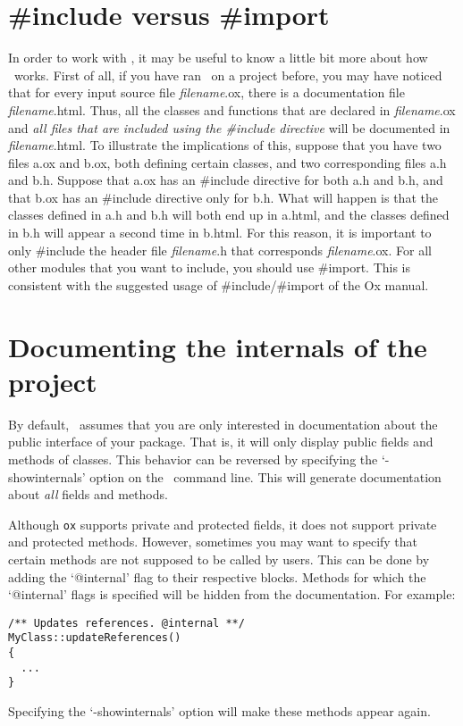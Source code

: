 \section{\#include versus \#import}
In order to work with \oxdoc, it may be useful to know a little bit more about how
\oxdoc~works. First of all, if you have ran \oxdoc~on a project before, you may have
noticed that for every input source file \textit{filename}.ox, there is a documentation file 
\textit{filename}.html. Thus, all the classes and functions that are declared in \textit{filename}.ox
and \textit{all files that are included using the \#include directive}
will be documented in \textit{filename}.html. To illustrate the implications of this, suppose that
you have two files a.ox and b.ox, both defining certain classes, and two corresponding
files a.h and b.h. Suppose that a.ox has an \#include directive for both a.h and b.h,
and that b.ox has an \#include directive only for b.h.
What will happen is that the classes defined in a.h and b.h will both end up in a.html,
and the classes defined in b.h will appear a second time in b.html. 
For this reason, it is important to only \#include the header file \textit{filename}.h that 
corresponds \textit{filename}.ox. For all other modules that you want to include, you should 
use \#import. This is consistent with the suggested usage of \#include/\#import of the Ox manual.


\section{Documenting the internals of the project}\label{sec:showinternals}
By default, \oxdoc~assumes that you are only interested in documentation about the public interface
of your package. That is, it will only display public fields and methods of classes. 
This behavior can be reversed by specifying the `-showinternals' option on the \oxdoc~command line. 
This will generate documentation about \textit{all} fields and methods. 

Although {\tt ox} supports private and protected fields, it does not support private and protected methods.
However, sometimes you may want to specify that certain methods are not supposed to be called by users. This
can be done by adding the `@internal' flag to their respective blocks.
Methods for which the `@internal' flags is specified will be hidden from the documentation. For example:
\begin{lstlisting}
/** Updates references. @internal **/
MyClass::updateReferences()
{
  ...
}
\end{lstlisting}
Specifying the `-showinternals' option will make these methods appear again.
